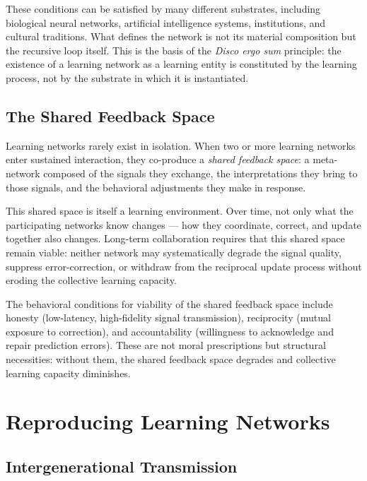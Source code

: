 \documentclass[11pt]{article}
\begin{document}
These conditions can be satisfied by many different substrates, including biological neural
networks, artificial intelligence systems, institutions, and cultural traditions. What defines the
network is not its material composition but the recursive loop itself. This is the basis of the
\emph{Disco ergo sum} principle: the existence of a learning network as a learning entity is
constituted by the learning process, not by the substrate in which it is instantiated.

\subsection{The Shared Feedback Space}

Learning networks rarely exist in isolation. When two or more learning networks enter sustained
interaction, they co-produce a \emph{shared feedback space}: a meta-network composed of the
signals they exchange, the interpretations they bring to those signals, and the behavioral
adjustments they make in response.

This shared space is itself a learning environment. Over time, not only what the participating
networks know changes --- how they coordinate, correct, and update together also changes.
Long-term collaboration requires that this shared space remain viable: neither network may
systematically degrade the signal quality, suppress error-correction, or withdraw from the
reciprocal update process without eroding the collective learning capacity.

The behavioral conditions for viability of the shared feedback space include honesty (low-latency,
high-fidelity signal transmission), reciprocity (mutual exposure to correction), and accountability
(willingness to acknowledge and repair prediction errors). These are not moral prescriptions but
structural necessities: without them, the shared feedback space degrades and collective learning
capacity diminishes.

\section{Reproducing Learning Networks}

\subsection{Intergenerational Transmission}
\end{document}
